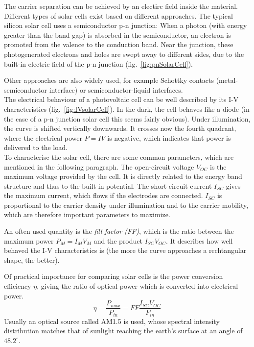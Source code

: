 The carrier separation can be achieved by an electirc field inside the material. Different types of solar cells exist based on different approaches. The typical silicon solar cell uses a semiconductor p-n junction: When a photon (with energy greater than the band gap) is absorbed in the semiconductor, an electron is promoted from the valence to the conduction band. Near the junction, these photogenerated electrons and holes are swept away to different sides, due to the built-in electric field of the p-n junction (fig.~\ref{fig:pnSolarCell}). 

Other approaches are also widely used, for example Schottky contacts (metal-semiconductor interface) or semiconductor-liquid interfaces.\\

The electrical behaviour of a photovoltaic cell can be well described by its I-V characteristics (fig.~\ref{fig:IVsolarCell}). In the dark, the cell behaves like a diode (in the case of a p-n junction solar cell this seems fairly obvious). Under illumination, the curve is shifted vertically downwards. It crosses now the fourth quadrant, where the electrical power $P=IV$ is negative, which indicates that power is delivered to the load.\\

To characterise the solar cell, there are some common parameters, which are mentioned in the following paragraph. The open-circuit voltage $V_{OC}$ is the maximum voltage provided by the cell. It is directly related to the energy band structure and thus to the built-in potential. The short-circuit current $I_{SC}$ gives the maximum current, which flows if the electrodes are connected. $I_{SC}$ is proportional to the carrier density under illumination and to the carrier mobility, which are therefore important parameters to maximize.

An often used quantity is the \textit{fill factor (FF)}, which is the ratio between the maximum power $P_M=I_M V_M$ and the product $I_{SC} V_{OC}$. It describes how well behaved the I-V characteristics is (the more the curve approaches a rechtangular shape, the better).

Of practical importance for comparing solar cells is the power conversion efficiency $\eta$, giving the ratio of optical power which is converted into electrical power. 
\[\eta = \frac{P_{max}}{P_{in}} = FF\frac{I_{SC}V_{OC}}{P_{in}}\]
Usually an optical source called AM1.5 is used, whose spectral intensity distribution matches that of sunlight reaching the earth's surface at an angle of $48.2^{\circ}$. \cite[pp.426-433]{ChemRev}

